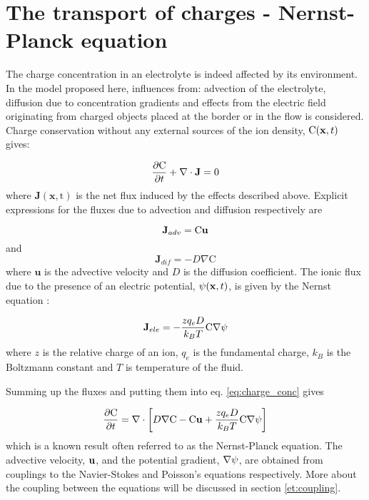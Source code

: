 \section{The transport of charges - Nernst-Planck equation}
The charge concentration in an electrolyte is indeed affected by its
environment. In the model proposed here, influences from: advection of
the electrolyte, diffusion due to concentration gradients and effects
from the electric field originating from charged objects placed at the
border or in the flow is considered. Charge conservation without any
external sources of the ion density, $\mathrm{C}(\mathbf{x}, t)$ gives:

\begin{equation}\label{eq:charge_conc}
\dfrac{\partial \mathrm{C}}{\partial t} + \nabla \cdot \mathbf{J} = 0
\end{equation}
where $\mathbf{J(\mathbf{x}, \mathrm{t})}$ is the net flux induced
by the effects described above. Explicit expressions for the fluxes
due to advection and diffusion respectively are 

\begin{equation}
\mathbf{J}_{adv} =
\mathrm{C}\mathbf{u}
\end{equation}
and 
\begin{equation}
\mathbf{J}_{dif} = -D\nabla \mathrm{C} 
\end{equation}
where $\mathbf{u}$ is the advective velocity and $D$ is the diffusion
coefficient. The ionic flux due to the presence of an electric
potential, $\mathrm{\psi}(\mathbf{x}, t)$, is given by the Nernst equation
\cite{dongquing-ren-book}:

\begin{equation}
\mathbf{J}_{ele} = -\frac{zq_eD}{k_BT}\mathrm{C}\nabla\mathrm{\psi}
\end{equation}
where $z$ is the relative charge of an ion, $q_e$ is the fundamental
charge, $k_B$ is the Boltzmann constant and $T$ is temperature of the
fluid.

Summing up the fluxes and putting them into eq. \eqref{eq:charge_conc} gives


\begin{equation}\label{np}
\dfrac{\partial \mathrm{C}}{\partial t} = \nabla \cdot \left [
 D\nabla \mathrm{C} - \mathrm{C}\mathbf{u} + \frac{zq_eD}{k_BT}\mathrm{C}\nabla\mathrm{\psi}
\right]
\end{equation}
which is a known result often referred to as the Nernst-Planck
equation. The advective velocity, $\mathbf{u}$, and the potential gradient,
$\nabla \mathrm{\psi}$, are obtained from couplings to the Navier-Stokes and
Poisson's equations respectively. More about the coupling between the
equations will be discussed in section \ref{et:coupling}.

